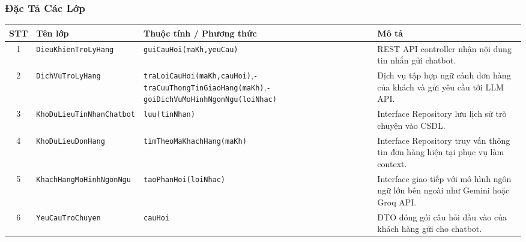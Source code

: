 \subsubsection{Đặc Tả Các Lớp}
\begin{table}[H]
  \centering
  \small
  \begin{tabularx}{\textwidth}{|c|>{\raggedright\arraybackslash}p{3.5cm}|>{\raggedright\arraybackslash}p{4.5cm}|>{\raggedright\arraybackslash}X|}
    \hline
    \textbf{STT} & \textbf{Tên lớp} & \textbf{Thuộc tính / Phương thức} & \textbf{Mô tả} \\
    \hline
    1 & \texttt{Dieu\allowbreak Khien\allowbreak Tro\allowbreak Ly\allowbreak Hang} & \texttt{gui\allowbreak Cau\allowbreak Hoi\allowbreak (ma\allowbreak Kh,\allowbreak yeu\allowbreak Cau)} & REST API controller nhận nội dung tin nhắn gửi chatbot. \\ \hline
    2 & \texttt{Dich\allowbreak Vu\allowbreak Tro\allowbreak Ly\allowbreak Hang} & \texttt{tra\allowbreak Loi\allowbreak Cau\allowbreak Hoi\allowbreak (ma\allowbreak Kh,\allowbreak cau\allowbreak Hoi)},\newline \texttt{- tra\allowbreak Cuu\allowbreak Thong\allowbreak Tin\allowbreak Giao\allowbreak Hang\allowbreak (ma\allowbreak Kh)},\newline \texttt{- goi\allowbreak Dich\allowbreak Vu\allowbreak Mo\allowbreak Hinh\allowbreak Ngon\allowbreak Ngu\allowbreak (loi\allowbreak Nhac)} & Dịch vụ tập hợp ngữ cảnh đơn hàng của khách và gửi yêu cầu tới LLM API. \\ \hline
    3 & \texttt{Kho\allowbreak Du\allowbreak Lieu\allowbreak Tin\allowbreak Nhan\allowbreak Chatbot} & \texttt{luu\allowbreak (tin\allowbreak Nhan)} & Interface Repository lưu lịch sử trò chuyện vào CSDL. \\ \hline
    4 & \texttt{Kho\allowbreak Du\allowbreak Lieu\allowbreak Don\allowbreak Hang} & \texttt{tim\allowbreak Theo\allowbreak Ma\allowbreak Khach\allowbreak Hang\allowbreak (ma\allowbreak Kh)} & Interface Repository truy vấn thông tin đơn hàng hiện tại phục vụ làm context. \\ \hline
    5 & \texttt{Khach\allowbreak Hang\allowbreak Mo\allowbreak Hinh\allowbreak Ngon\allowbreak Ngu} & \texttt{tao\allowbreak Phan\allowbreak Hoi\allowbreak (loi\allowbreak Nhac)} & Interface giao tiếp với mô hình ngôn ngữ lớn bên ngoài như Gemini hoặc Groq API. \\ \hline
    6 & \texttt{Yeu\allowbreak Cau\allowbreak Tro\allowbreak Chuyen} & \texttt{cau\allowbreak Hoi} & DTO đóng gói câu hỏi đầu vào của khách hàng gửi cho chatbot. \\ \hline

\end{tabularx}
\end{table}
